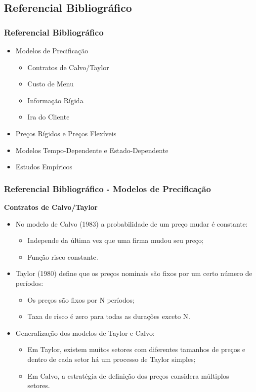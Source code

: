 \documentclass[aspectratio=169]{beamer}
\begin{document}
\subsection{Referencial Bibliográfico}

\begin{frame}\frametitle{Referencial Bibliográfico}
  \begin{itemize}[<+->]
  \item Modelos de Precificação
    \begin{itemize}
      \item Contratos de Calvo/Taylor
      \item Custo de Menu
      \item Informação Rígida
      \item Ira do Cliente
    \end{itemize}
  \item Preços Rígidos e Preços Flexíveis
  \item Modelos Tempo-Dependente e Estado-Dependente
  \item Estudos Empíricos
  \end{itemize}
\end{frame}

\begin{frame}\frametitle{Referencial Bibliográfico - Modelos de Precificação}
  \textbf{Contratos de Calvo/Taylor}
  \begin{itemize}
  \item No modelo de Calvo (1983) a probabilidade de um preço mudar é constante:
    \begin{itemize}
      \item Independe da última vez que uma firma mudou seu preço;
      \item Função risco constante.
    \end{itemize}
  \item Taylor (1980) define que os preços nominais são fixos por um certo número de períodos:
    \begin{itemize}
      \item Os preços são fixos por N períodos;
      \item Taxa de risco é zero para todas as durações exceto N.
    \end{itemize}
  \item Generalização dos modelos de Taylor e Calvo:
    \begin{itemize}
      \item Em Taylor, existem muitos setores com diferentes tamanhos de preços e dentro de cada setor há um processo de Taylor simples;
      \item Em Calvo, a estratégia de definição dos preços considera múltiplos setores.
    \end{itemize}
  \end{itemize}
\end{frame}
\end{document}
